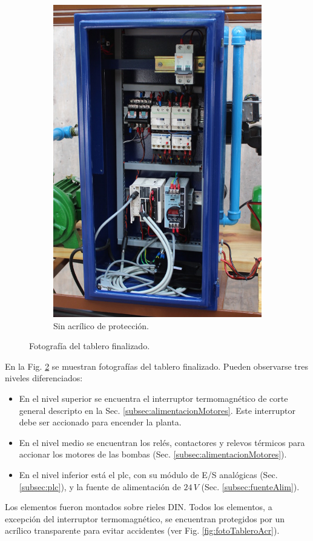 \begin{figure}[t]
\begin{subfigure}[b]{0.48\textwidth}
\includegraphics[width=\textwidth]{Cap3-TableroElectrico/Images/IMG_5097.JPG}
 \caption{Sin acrílico de protección.}
 \label{fig:fotoTableroSAcr}
        \end{subfigure}
        \caption{Fotografía del tablero finalizado.}
        \label{fig:fotoTablero}
\end{figure}

En la Fig. \ref{fig:fotoTablero} se muestran fotografías del tablero finalizado.
Pueden observarse tres niveles diferenciados:
\begin{itemize}
 \item En el nivel superior se encuentra el interruptor termomagnético de corte
general descripto en la Sec. \ref{subsec:alimentacionMotores}.
Este interruptor debe ser accionado para encender la planta.
\item En el nivel medio se encuentran los relés, contactores y relevos térmicos
para accionar los motores de las bombas (Sec.
\ref{subsec:alimentacionMotores}).
\item En el nivel inferior está el
\gls{plc}, con su módulo de E/S analógicas (Sec. \ref{subsec:plc}), y la fuente
de alimentación de $24\,V$ (Sec.
\ref{subsec:fuenteAlim}).
\end{itemize}
Los elementos fueron montados sobre
rieles DIN.  Todos los elementos, a excepción del interruptor
termomagnético, se encuentran protegidos por un acrílico transparente para
evitar accidentes (ver Fig. \ref{fig:fotoTableroAcr}).
